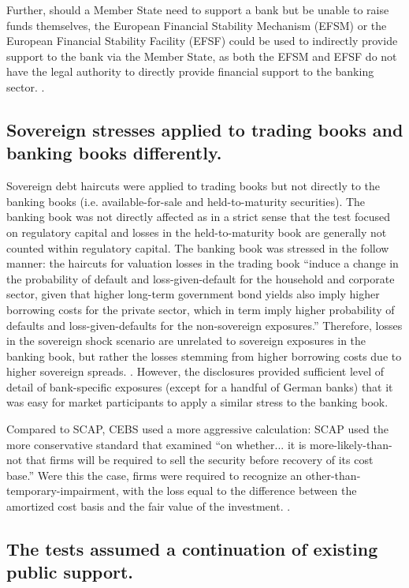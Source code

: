 \documentclass[12pt]{article}
\begin{document}
Further, should a Member State need to support a bank but be unable to raise funds themselves, the European Financial Stability Mechanism (EFSM) or the European Financial Stability Facility (EFSF) could be used to indirectly provide support to the bank via the Member State, as both the EFSM and EFSF do not have the legal authority to directly provide financial support to the banking sector. \citep{QA}.


\subsection{Sovereign stresses applied to trading books and banking books differently.}

Sovereign debt haircuts were applied to trading books but not directly to the banking books (i.e. available-for-sale and held-to-maturity securities). The banking book was not directly affected as  in a strict sense that the test focused on regulatory capital and losses in the held-to-maturity book are generally not counted within regulatory capital. The banking book was stressed in the follow manner: the haircuts for valuation losses in the trading book ``induce a change in the probability of default and loss-given-default for the household and corporate sector, given that higher long-term government bond yields also imply higher borrowing costs for the private sector, which in term imply higher probability of defaults and loss-given-defaults for the non-sovereign exposures.''  Therefore, losses in the sovereign shock scenario are unrelated to sovereign exposures in the banking book, but rather the losses stemming from higher borrowing costs due to higher sovereign spreads. \citep{Samuels}. However, the disclosures provided sufficient level of detail of bank-specific exposures (except for a handful of German banks) that it was easy for market participants to apply a similar stress to the banking book.

Compared to SCAP, CEBS used a more aggressive calculation: SCAP used the more conservative standard that examined ``on whether... it is more-likely-than-not that firms will be required to sell the security before recovery of its cost base.'' Were this the case, firms were required to recognize an other-than-temporary-impairment, with the loss equal to the difference between the amortized cost basis and the fair value of the investment. \citep{SCAPResults}.

\subsection{The tests assumed a continuation of existing public support.}
\end{document}
